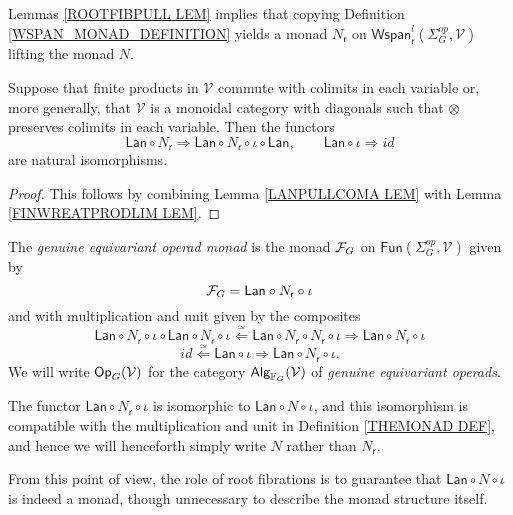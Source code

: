 \documentclass[a4paper,10pt]{article}%
\begin{document}
Lemmas \ref{ROOTFIBPULL LEM} implies that copying Definition \ref{WSPAN_MONAD_DEFINITION} yields a monad $N_{\mathsf{r}}$
on
$\mathsf{Wspan}^l_{\mathsf{r}}(\Sigma_G^{op},\mathcal{V})$
lifting the monad $N$.

\begin{corollary}
Suppose that finite products in $\mathcal{V}$ commute with colimits in each variable or, more generally, that 
$\mathcal{V}$ is a monoidal category with diagonals such that $\otimes$ preserves colimits in each variable.
Then the functors
\[
	\mathsf{Lan} \circ N_{\mathsf{r}} \Rightarrow
	\mathsf{Lan} \circ N_{\mathsf{r}} \circ \iota \circ \mathsf{Lan},
\qquad
	\mathsf{Lan} \circ \iota \Rightarrow id
\]
are natural isomorphisms.
\end{corollary}

\begin{proof}
This follows by combining Lemma \ref{LANPULLCOMA LEM} with Lemma \ref{FINWREATPRODLIM LEM}.
\end{proof}


\begin{definition}\label{THEMONAD DEF}
The \textit{genuine equivariant operad monad} is the monad
$\mathcal F_G$ on $\mathsf{Fun}(\Sigma_G^{op}, \mathcal{V})$
given by
\[
	\mathcal F_G = \mathsf{Lan} \circ N_{\mathsf{r}} \circ \iota
\]
and with multiplication and unit given by the composites
\[
\mathsf{Lan} \circ N_{\mathsf{r}} \circ \iota \circ
\mathsf{Lan} \circ N_{\mathsf{r}} \circ \iota
\overset{\simeq}{\Leftarrow}
\mathsf{Lan} \circ N_{\mathsf{r}} \circ  N_{\mathsf{r}} \circ \iota
\Rightarrow
\mathsf{Lan} \circ N_{\mathsf{r}} \circ \iota
\]
\[
id \overset{\simeq}{\Leftarrow} \mathsf{Lan} \circ \iota
\Rightarrow
\mathsf{Lan} \circ N_{\mathsf{r}} \circ \iota.
\]
We will write $\mathsf{Op}_G(\mathcal V)$ for the category $\mathsf{Alg}_{\mathbb F_G}(\mathcal V)$ of \textit{genuine equivariant operads}.
\end{definition}

\begin{remark}
	The functor $\mathsf{Lan} \circ N_{\mathsf{r}} \circ \iota$ is isomorphic to 
	$\mathsf{Lan} \circ N \circ \iota$, and this isomorphism is compatible with the multiplication and unit	in Definition \ref{THEMONAD DEF}, and hence we will henceforth simply write $N$ rather than $N_{\mathsf{r}}$.
	
	From this point of view, the role of root fibrations is to guarantee that $\mathsf{Lan} \circ N \circ \iota$ is indeed a monad, though unnecessary to describe the monad structure itself.
\end{remark}
\end{document}
